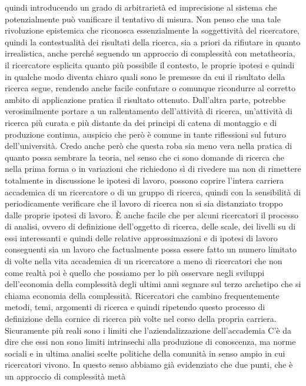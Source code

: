 \documentclass[a4paper, headings=standardclasses]{scrartcl}
\begin{document}
quindi introducendo un grado di arbitrarietà ed imprecisione al sistema che potenzialmente
può vanificare il tentativo di misura. Non penso che una tale rivoluzione epistemica
che riconosca essenzialmente la soggettività del ricercatore, quindi la contestualità dei risultati
della ricerca, sia a priori da rifiutare in quanto irrealistica, anche perché seguendo un approccio
di complessità con metatheoria, il ricercatore esplicita quanto più possibile il contesto,
le proprie ipotesi e quindi in qualche modo diventa chiaro quali sono le premesse da cui
il risultato della ricerca segue, rendendo anche facile confutare o comunque ricondurre al corretto
ambito di applicazione pratica il risultato ottenuto. Dall'altra parte, potrebbe verosimilmente
portare a un rallentamento dell'attività di ricerca, un'attività di ricerca più curata
e più distante da dei principi di catena di montaggio e di produzione continua,
auspicio che però è comune in tante riflessioni sul futuro dell'università. Credo anche però che
questa roba sia meno vera nella pratica di quanto possa sembrare la teoria, nel senso che ci sono
domande di ricerca che nella prima forma o in variazioni che richiedono sì di rivedere ma non
di rimettere totalmente in discussione le ipotesi di lavoro, possono coprire l'intera carriera
accademica di un ricercatore o di un gruppo di ricerca, quindi con la sensibilità di periodicamente
verificare che il lavoro di ricerca non si sia distanziato troppo dalle proprie ipotesi di lavoro.
È anche facile che per alcuni ricercatori il processo di analisi, ovvero di definizione dell'oggetto
di ricerca, delle scale, dei livelli su di essi interessanti e quindi delle relative
approssimazioni e di ipotesi di lavoro conseguenti sia un lavoro che factualmente possa essere fatto
un numero limitato di volte nella vita accademica di un ricercatore a meno di ricercatori che non
come realtà poi è quello che possiamo per lo più osservare negli sviluppi dell'economia
della complessità degli ultimi anni segnare sul terzo archetipo che si chiama economia della
complessità. Ricercatori che cambino frequentemente metodi, temi, argomenti di ricerca e quindi
ripetendo questo processo di definizione della cornice di ricerca più volte nel corso della
propria carriera. Sicuramente più reali sono i limiti che l'aziendalizzazione dell'accademia
C'è da dire che essi non sono limiti intrinsechi alla produzione di conoscenza, ma norme sociali
e in ultima analisi scelte politiche della comunità in senso ampio in cui ricercatori vivono.
In questo senso abbiamo già evidenziato che due punti, che è un approccio di complessità metà
\end{document}
